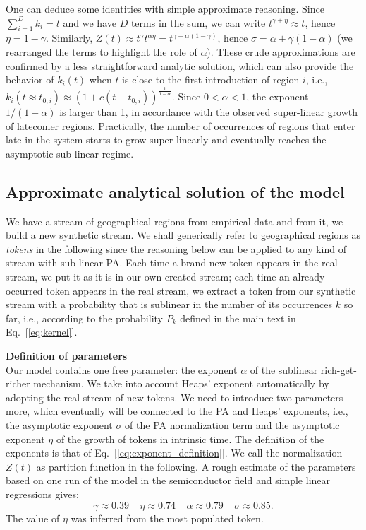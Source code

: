 \documentclass[draft,final]{vutinfth} %
\begin{document}
One can deduce some identities with simple approximate reasoning.
Since $\sum_{i=1}^D k_i = t$ and we have $D$ terms in the sum, we can write $t^{\gamma+\eta}\approx t$, hence $\eta=1-\gamma$. 
Similarly, $Z(t)\approx t^\gamma t^{\alpha\eta}=t^{\gamma+\alpha(1-\gamma)}$, hence $\sigma= \alpha+\gamma(1-\alpha)$ (we rearranged the terms to highlight the role of $\alpha$).
These crude approximations are confirmed by a less straightforward analytic solution, which can also provide the behavior of $k_i(t)$ when $t$ is close to the first introduction of region $i$, i.e., $k_i(t \approx t_{0,i}) \approx (1+c(t-t_{0,i}))^\frac{1}{1-\alpha}$.
Since $0<\alpha<1$, the exponent $1/(1-\alpha)$ is larger than 1, in accordance with the observed super-linear growth of latecomer regions.
Practically, the number of occurrences of regions that enter late in the system starts to grow super-linearly and eventually reaches the asymptotic sub-linear regime.

\subsection{Approximate analytical solution of the model}
\label{app:analytical}

We have a stream of geographical regions from empirical data and from it, we build a new synthetic stream.
We shall generically refer to geographical regions as \emph{tokens} in the following since the reasoning below can be applied to any kind of stream with sub-linear PA.
Each time a brand new token appears in the real stream, we put it as it is in our own created stream;
each time an already occurred token appears in the real stream, we extract a token from our synthetic stream with a probability that is sublinear in the number of its occurrences $k$ so far, i.e., according to the probability $P_k$ defined in the main text in Eq.~[\ref{eq:kernel}].

\vspace{1mm}\noindent\textbf{Definition of parameters}\\
Our model contains one free parameter: the exponent 
$\alpha$ of the sublinear rich-get-richer mechanism.
We take into account Heaps' exponent automatically by adopting the real stream of new tokens.  
We need to introduce two parameters more, which eventually will be connected to the PA and Heaps' exponents, i.e., the asymptotic exponent $\sigma$ of the PA normalization term and the asymptotic exponent $\eta$ of the growth of tokens in intrinsic time.
The definition of the exponents is that of Eq.~[\ref{eq:exponent_definition}].
We call the normalization $Z(t)$ as partition function in the following.
A rough estimate of the parameters based on one run of the model in the semiconductor field and simple linear regressions gives:
\begin{equation}
    \gamma\approx0.39 ~~~~~ \eta\approx0.74 ~~~~~
     \alpha\approx0.79 ~~~~~ \sigma\approx0.85.
\end{equation}
The value of $\eta$ was inferred from the most populated token.
\end{document}
